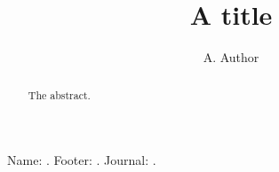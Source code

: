 \documentclass[preprint]{elsarticle}
\makeatletter
\newcommand\showall{Name: \abstractname. Footer: \@elsarticlemyfooter. Journal: \@journal.}
\makeatother
\begin{document}
\begin{frontmatter}
\title{A title}
\author{A. Author}
\begin{abstract}
The abstract.
\end{abstract}
\end{frontmatter}
\showall
\end{document}
